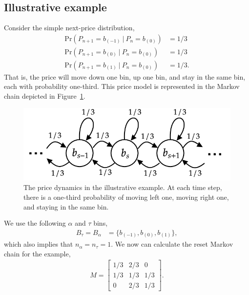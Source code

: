 \documentclass[sigconf, usenames, dvipsnames]{acmart}
\begin{document}
\subsection{Illustrative example}
Consider the simple next-price distribution,
\begin{align*}
    \mathrm{Pr}(P_{n+1}= b_{(-1)}~|~P_n = b_{(0)}) &= 1/3\\
    \mathrm{Pr}(P_{n+1}= b_{(0)}~|~P_n = b_{(0)}) &= 1/3 \\
    \mathrm{Pr}(P_{n+1}= b_{(1)}~|~P_n = b_{(0)}) &= 1/3.
\end{align*}
That is, the price will move down one bin, up one bin, and stay in the same bin, each with probability one-third. This price model is represented in the Markov chain depicted in Figure~\ref{fig:toy_dist}.
\begin{figure}
    \centering
    \includegraphics[width=\linewidth]{img/toy_dist.png}
    \caption{The price dynamics in the illustrative example. At each time step, there is a one-third probability of moving left one, moving right one, and staying in the same bin. 
    \label{fig:toy_dist}}
\end{figure}
We use the following $\alpha$ and $\tau$ bins,
\begin{align*}
    B_\tau = B_\alpha&=\{b_{(-1)}, b_{(0)}, b_{(1)}\},
\end{align*}
which also implies that $n_{\alpha} = n_{\tau} = 1$.
We now can calculate the reset Markov chain for the example,
\begin{align*}
    M = 
    \begin{bmatrix}
      1/3 & 2/3 & 0 \\
      1/3 & 1/3 & 1/3 \\
      0 & 2/3 & 1/3
    \end{bmatrix}.
\end{align*}
\end{document}
